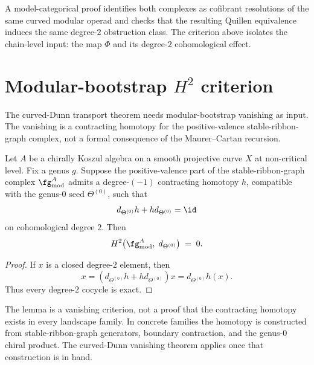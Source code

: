\begin{remark}
\label{rem:BMDC}
A model-categorical proof identifies both complexes as cofibrant
resolutions of the same curved modular operad and checks that the
resulting Quillen equivalence induces the same degree-\(2\)
obstruction class. The criterion above isolates the chain-level
input: the map \(\Phi\) and its degree-\(2\) cohomological effect.
\end{remark}

\section{Modular-bootstrap \texorpdfstring{$H^{2}$}{H2} criterion}
\label{sec:modular-bootstrap-h2-named-lemma}

The curved-Dunn transport theorem needs modular-bootstrap vanishing
as input. The vanishing is a contracting homotopy for the
positive-valence stable-ribbon-graph complex, not a formal
consequence of the Maurer--Cartan recursion.

\begin{lemma}
\label{lem:modular-bootstrap-H2-vanishing}
Let \(A\) be a chirally Koszul algebra on a smooth projective curve
\(X\) at non-critical level. Fix a genus \(g\). Suppose the
positive-valence part of the stable-ribbon-graph complex
\(\fg^{A}_{\mathrm{mod}}\) admits a degree-\((-1)\) contracting
homotopy \(h\), compatible with the genus-\(0\) seed
\(\Theta^{(0)}\), such that
\[
d_{\Theta^{(0)}}h+h d_{\Theta^{(0)}}=\id
\]
on cohomological degree \(2\). Then
\[
 H^{2}\bigl(\fg^{A}_{\mathrm{mod}},\; d_{\Theta^{(0)}}\bigr)
 \;=\;
 0.
\]
\end{lemma}

\begin{proof}
If \(x\) is a closed degree-\(2\) element, then
\[
x=(d_{\Theta^{(0)}}h+h d_{\Theta^{(0)}})x
  =d_{\Theta^{(0)}}h(x).
\]
Thus every degree-\(2\) cocycle is exact.
\end{proof}

\begin{remark}
\label{rem:modular-bootstrap-h2-criterion-use}
The lemma is a vanishing criterion, not a proof that the contracting
homotopy exists in every landscape family. In concrete families the
homotopy is constructed from stable-ribbon-graph generators,
boundary contraction, and the genus-\(0\) chiral product. The
curved-Dunn vanishing theorem applies once that construction is in
hand.
\end{remark}

